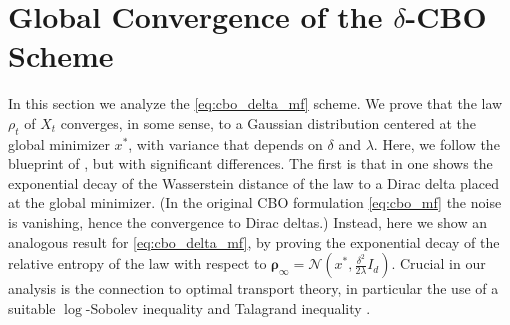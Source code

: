 \documentclass[reqno]{amsart}
\numberwithin{algorithm}{section}
\begin{document}
{\section{Global Convergence of the $\delta$-CBO Scheme}\label{sec:delta_CBO}
In this section we analyze the \eqref{eq:cbo_delta_mf} scheme. We prove that the law $\rho_t$ of $X_t$ converges, in some sense, to a Gaussian distribution centered at the global minimizer $x^*$, with variance that depends on $\delta$ and $\lambda$.
Here, we follow the blueprint of \cite[Theorem 3.7]{B1-fornasier2021global}, but with significant differences. The first is that in \cite[Theorem 3.7]{B1-fornasier2021global} one shows the exponential decay of the Wasserstein distance of the law to a Dirac delta placed at the global minimizer. (In the original CBO formulation \eqref{eq:cbo_mf} the noise is vanishing, hence the convergence to Dirac deltas.) Instead, here we show an analogous result for \eqref{eq:cbo_delta_mf}, by proving the exponential decay of the relative entropy of the law with respect to $\boldsymbol\rho_\infty=\mathcal N\left(x^*,\frac{\delta^2}{2\lambda}I_d\right)$. Crucial in our analysis is the connection to optimal transport theory, in particular the use of a suitable $\log$-Sobolev inequality and Talagrand inequality \cite[Sections §22.1–§22.2]{villani2009optimal}.
\\

}
\end{document}
